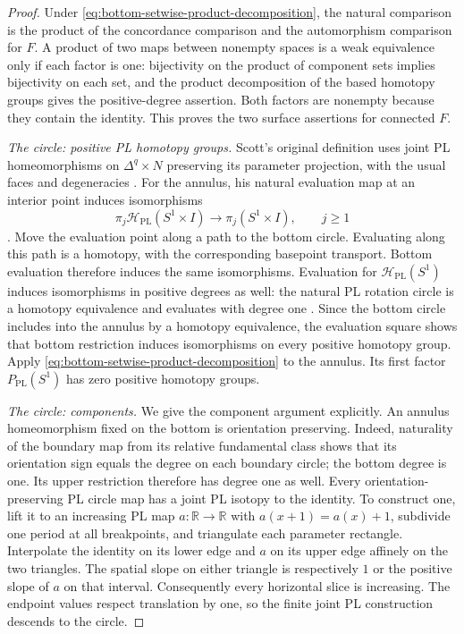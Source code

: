 \begin{proof}
Under \eqref{eq:bottom-setwise-product-decomposition}, the natural
comparison is the product of the concordance comparison and the
automorphism comparison for $F$.  A product of two maps between
nonempty spaces is a weak equivalence only if each factor is one:
bijectivity on the product of component sets implies bijectivity
on each set, and the product decomposition of the based homotopy
groups gives the positive-degree assertion.  Both factors are
nonempty because they contain the identity.  This proves the two
surface assertions for connected $F$.

\medskip\noindent\textit{The circle: positive PL homotopy groups.}
Scott's original definition uses joint PL homeomorphisms on
$\Delta^q\times N$ preserving its parameter projection, with the
usual faces and degeneracies
\cite[Chapter~III, Definition~0.1, p.~19]{Scott1968}.
For the annulus, his natural evaluation map at an interior point
induces isomorphisms
\[
 \pi_j\mathcal H_{\mathrm{PL}}(S^1\times I)
   \longrightarrow\pi_j(S^1\times I),\qquad j\geq1
\]
\cite[Chapter~IV, Theorem~3.1(b)(iii), p.~51,
and its annulus proof, p.~53]{Scott1968}.
Move the evaluation point along a path to the bottom circle.  Evaluating
along this path is a homotopy, with the corresponding basepoint
transport.  Bottom evaluation therefore induces the same
isomorphisms.  Evaluation for $\mathcal H_{\mathrm{PL}}(S^1)$
induces isomorphisms in positive degrees as well: the natural PL
rotation circle is a homotopy equivalence and evaluates with degree
one \cite[Theorem~2.2.4 and proof, pp.~223--224]{Hamstrom1974}.
Since the bottom circle includes into the annulus by a homotopy
equivalence, the evaluation square shows that bottom restriction
induces isomorphisms on every positive homotopy group.
Apply \eqref{eq:bottom-setwise-product-decomposition} to the annulus.
Its first factor $P_{\mathrm{PL}}(S^1)$ has zero positive homotopy
groups.

\medskip\noindent\textit{The circle: components.}
We give the component argument explicitly.  An annulus homeomorphism
fixed on the bottom is orientation preserving.  Indeed, naturality of
the boundary map from its relative fundamental class shows that its
orientation sign equals the degree on each boundary circle; the bottom
degree is one.  Its upper restriction therefore has degree one as well.  Every
orientation-preserving PL circle map has a joint PL isotopy to the
identity.  To construct one, lift it to an increasing PL map
$a:\mathbb R\to\mathbb R$ with $a(x+1)=a(x)+1$, subdivide one
period at all breakpoints, and triangulate each parameter rectangle.
Interpolate the identity on its lower edge and $a$ on its upper
edge affinely on the two triangles.  The spatial slope on either
triangle is respectively $1$ or the positive slope of $a$ on that
interval.  Consequently every horizontal slice is increasing.
The endpoint values respect translation by one, so the finite
joint PL construction descends to the circle.


\end{proof}
